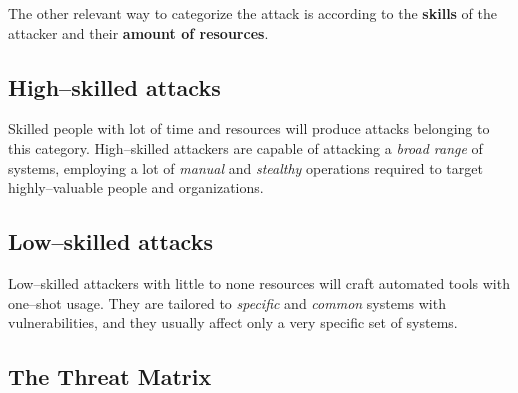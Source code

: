 \documentclass[10pt]{extreport}
\begin{document}
The other relevant way to categorize the attack is according to the
\textbf{skills} of the attacker and their \textbf{amount of resources}.

\subsection{High--skilled attacks}

Skilled people with lot of time and resources will produce attacks belonging to
this category. High--skilled attackers are capable of attacking a \emph{broad
range} of systems, employing a lot of \emph{manual} and \emph{stealthy}
operations required to target highly--valuable people and organizations.

\subsection{Low--skilled attacks}

Low--skilled attackers with little to none resources will craft automated tools
with one--shot usage. They are tailored to \emph{specific} and \emph{common}
systems with vulnerabilities, and they usually affect only a very specific set
of systems.

\subsection{The Threat Matrix}
\end{document}
